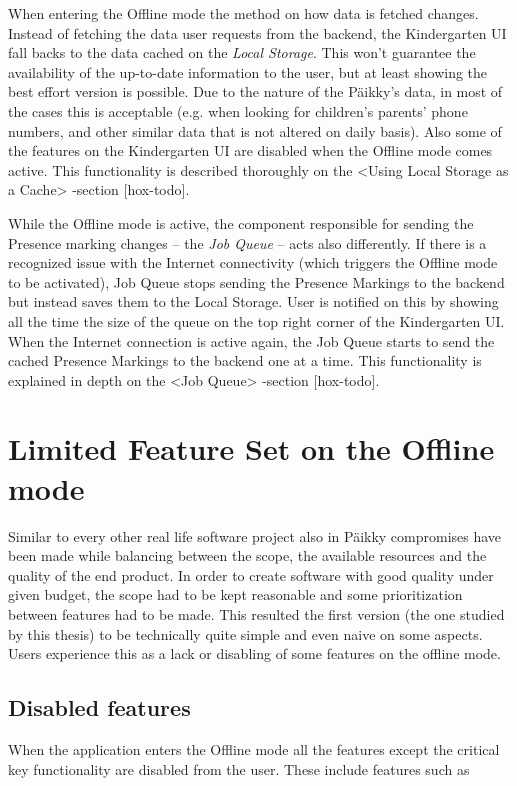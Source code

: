 When entering the Offline mode the method on how data is fetched changes. Instead of fetching the data user requests from the backend, the Kindergarten UI fall backs to the data cached on the \textit{Local Storage}. This won't guarantee the availability of the up-to-date information to the user, but at least showing the best effort version is possible. Due to the nature of the Päikky's data, in most of the cases this is acceptable (e.g. when looking for children's parents' phone numbers, and other similar data that is not altered on daily basis). Also some of the features on the Kindergarten UI are disabled when the Offline mode comes active. This functionality is described thoroughly on the <Using Local Storage as a Cache> -section [hox-todo].

While the Offline mode is active, the component responsible for sending the Presence marking changes – the \textit{Job Queue} – acts also differently. If there is a recognized issue with the Internet connectivity (which triggers the Offline mode to be activated), Job Queue stops sending the Presence Markings to the backend but instead saves them to the Local Storage. User is notified on this by showing all the time the size of the queue on the top right corner of the Kindergarten UI. When the Internet connection is active again, the Job Queue starts to send the cached Presence Markings to the backend one at a time. This functionality is explained in depth on the <Job Queue> -section [hox-todo]. 





\section{Limited Feature Set on the Offline mode}

Similar to every other real life software project also in Päikky compromises have been made while balancing between the scope, the available resources and the quality of the end product. In order to create software with good quality under given budget, the scope had to be kept reasonable and some prioritization between features had to be made. This resulted the first version (the one studied by this thesis) to be technically quite simple and even naive on some aspects. Users experience this as a lack or disabling of some features on the offline mode.




\subsection{Disabled features}
When the application enters the Offline mode all the features except the critical key functionality are disabled from the user. These include features such as

